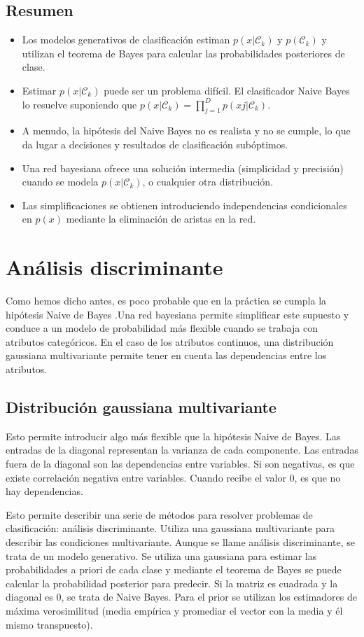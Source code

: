 \subsection{Resumen}
\begin{itemize}
\item Los modelos generativos de clasificación estiman $p(x|\mathcal{C}_k )$ y $p(\mathcal{C}_k )$ y utilizan el teorema de Bayes para calcular las probabilidades posteriores de clase.
\item Estimar $p(x|\mathcal{C}_k )$ puede ser un problema difícil. El clasificador Naive Bayes lo resuelve suponiendo que $p(x|\mathcal{C}_k ) = \prod^D_{j=1} p(xj |\mathcal{C}_k )$.
\item A menudo, la hipótesis del Naive Bayes no es realista y no se cumple, lo que da lugar a decisiones y resultados de clasificación subóptimos.
\item Una red bayesiana ofrece una solución intermedia (simplicidad y precisión) cuando se modela $p(x|\mathcal{C}_k )$, o cualquier otra distribución.
\item Las simplificaciones se obtienen introduciendo independencias condicionales en $p(x)$ mediante la eliminación de aristas en la red.
\end{itemize}

\section{Análisis discriminante}
Como hemos dicho antes, es poco probable que en la práctica se cumpla la hipótesis Naive de Bayes .Una red bayesiana permite simplificar este supuesto y conduce a un modelo de probabilidad más flexible cuando se trabaja con atributos categóricos. En el caso de los atributos continuos, una distribución gaussiana multivariante permite tener en cuenta las dependencias entre los atributos.

\subsection{Distribución gaussiana multivariante}
Esto permite introducir algo más flexible que la hipótesis Naive de Bayes. Las entradas de la diagonal representan la varianza de cada componente. Las entradas fuera de la diagonal son las dependencias entre variables. Si son negativas, es que existe correlación negativa entre variables. Cuando recibe el valor 0, es que no hay dependencias. 

Esto permite describir una serie de métodos para resolver problemas de clasificación: análisis discriminante. Utiliza una gaussiana multivariante para describir las condiciones multivariante. Aunque se llame análisis discriminante, se trata de un modelo generativo. Se utiliza una gaussiana para estimar las probabilidades a priori de cada clase y mediante el teorema de Bayes se puede calcular la probabilidad posterior para predecir. Si la matriz es cuadrada y la diagonal es 0, se trata de Naive Bayes. Para el prior se utilizan los estimadores de máxima verosimilitud (media empírica y promediar el vector con la media y él mismo transpuesto). 

